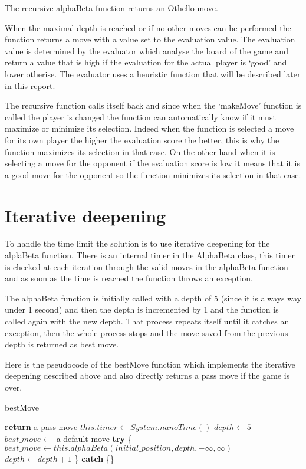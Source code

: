 The recursive alphaBeta function returns an Othello move.

When the maximal depth is reached or if no other moves can be performed the function returns a move with a value set to the evaluation value.
The evaluation value is determined by the evaluator which analyse the board of the game and return a value that is high if the evaluation for the actual player is `good' and lower otherise.
The evaluator uses a heuristic function that will be described later in this report.

The recursive function calls itself back and since when the `makeMove' function is called the player is changed the function can automatically know if it must maximize or minimize its selection.
Indeed when the function is selected a move for its own player the higher the evaluation score the better, this is why the function maximizes its selection in that case.
On the other hand when it is selecting a move for the opponent if the evaluation score is low it means that it is a good move for the opponent so the function minimizes its selection in that case.

\section{Iterative deepening}

To handle the time limit the solution is to use iterative deepening for the alplaBeta function.
There is an internal timer in the AlphaBeta class, this timer is checked at each iteration through the valid moves in the alphaBeta function and as soon as the time is reached the function throws an exception.

The alphaBeta function is initially called with a depth of 5 (since it is always way under 1 second) and then the depth is incremented by 1 and the function is called again with the new depth.
That process repeats itself until it catches an exception, then the whole process stops and the move saved from the previous depth is returned as best move.

Here is the pseudocode of the bestMove function which implements the iterative deepening described above and also directly returns a pass move if the game is over.

\FloatBarrier
\begin{algorithm}
    \caption{bestMove}
    \begin{algorithmic}[1]
                \State \textbf{return} a pass move
            \EndIf
            \State $this.timer \gets System.nanoTime()$
            \State $depth \gets 5$
            \State $best\_move \gets$ a default move
                \State \textbf{try} \{
                    \State $best\_move \gets this.alphaBeta(initial\_position, depth, -\infty, \infty)$
                    \State $depth \gets depth + 1$
                \State \} \textbf{catch} \{\}
            \EndWhile
        \EndProcedure
    \end{algorithmic}
\end{algorithm}
\FloatBarrier

